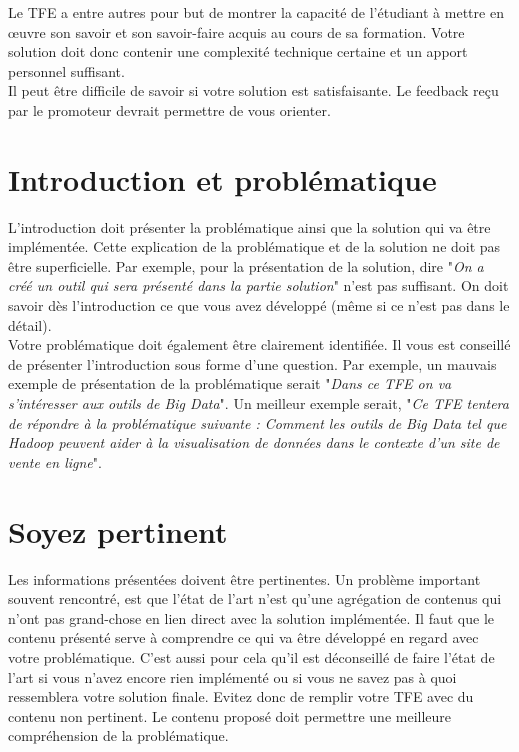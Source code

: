 \documentclass{HELBreport}
\begin{document}
Le TFE a entre autres pour but de montrer la capacité de l’étudiant à mettre en œuvre son savoir et son savoir-faire acquis au cours de sa formation. Votre solution doit donc contenir une complexité technique certaine et un apport personnel suffisant.\\ 

Il peut être difficile de savoir si votre solution est satisfaisante. Le feedback reçu par le promoteur devrait permettre de vous orienter. 

\section*{Introduction et problématique}

L'introduction doit présenter la problématique ainsi que la solution qui va être implémentée. Cette explication de la problématique et de la solution ne doit pas être superficielle. Par exemple, pour la présentation de la solution, dire "\textit{On a créé un outil qui sera présenté dans la partie solution}" n'est pas suffisant. On doit savoir dès l'introduction ce que vous avez développé (même si ce n'est pas dans le détail).\\

Votre problématique doit également être clairement identifiée. Il vous est conseillé de présenter l'introduction sous forme d'une question. Par exemple, un mauvais exemple de présentation de la problématique serait "\textit{Dans ce TFE on va s'intéresser aux outils de Big Data}". Un meilleur exemple serait, "\textit{Ce TFE tentera de répondre à la problématique suivante : Comment les outils de Big Data tel que Hadoop peuvent aider à la visualisation de données dans le contexte d'un site de vente en ligne}".

\section*{Soyez pertinent}

 Les informations présentées doivent être pertinentes. Un problème important souvent rencontré, est que l'état de l'art n'est qu'une agrégation de contenus qui n'ont pas grand-chose en lien direct avec la solution implémentée. Il faut que le contenu présenté serve à comprendre ce qui va être développé en regard avec votre problématique. C'est aussi pour cela qu'il est déconseillé de faire l'état de l'art si vous n'avez encore rien implémenté ou si vous ne savez pas à quoi ressemblera votre solution finale. Evitez donc de remplir votre TFE avec du contenu non pertinent. Le contenu proposé doit permettre une meilleure compréhension de la problématique.   
\end{document}
